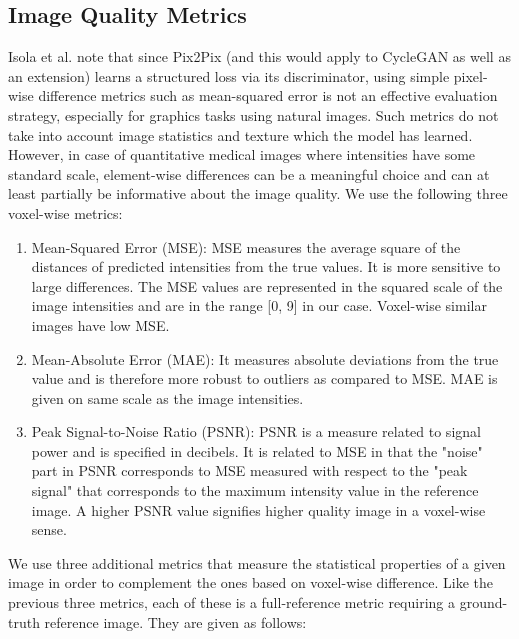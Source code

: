 \subsection{Image Quality Metrics}
\label{image_quality_metrics}
Isola et al. \cite{isola2017image} note that since Pix2Pix (and this would apply to CycleGAN as well as an extension) learns a structured loss via its discriminator, using simple pixel-wise difference metrics such as mean-squared error is not an effective evaluation strategy, especially for graphics tasks using natural images. Such metrics do not take into account image statistics and texture which the model has learned. However, in case of quantitative medical images where intensities have some standard scale, element-wise differences can be a meaningful choice and can at least partially be informative about the image quality. We use the following three voxel-wise metrics:

\begin{enumerate}
    \item Mean-Squared Error (MSE): MSE measures the average square of the distances of predicted intensities from the true values. It is more sensitive to large differences. The MSE values are represented in the squared scale of the image intensities and are in the range [0, 9] in our case. Voxel-wise similar images have low MSE.
    \item Mean-Absolute Error (MAE): It measures absolute deviations from the true value and is therefore more robust to outliers as compared to MSE. MAE is given on same scale as the image intensities.
    \item Peak Signal-to-Noise Ratio (PSNR): PSNR is a measure related to signal power and is specified in decibels. It is related to MSE in that the "noise" part in PSNR corresponds to MSE measured with respect to the "peak signal" that corresponds to the maximum intensity value in the reference image. A higher PSNR value signifies higher quality image in a voxel-wise sense.
\end{enumerate}

We use three additional metrics that measure the statistical properties of a given image in order to complement the ones based on voxel-wise difference. Like the previous three metrics, each of these is a full-reference metric requiring a ground-truth reference image. They are given as follows:

